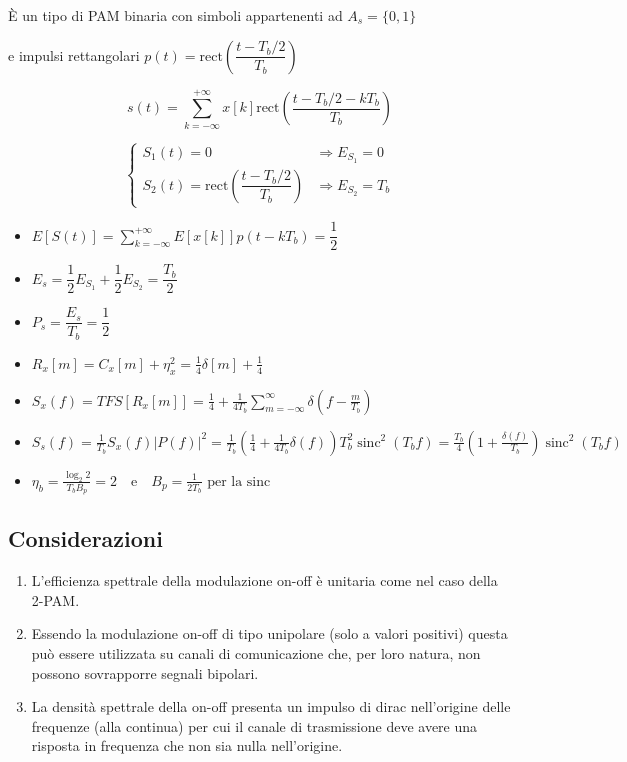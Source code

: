 È un tipo di PAM binaria con simboli appartenenti ad $A_s = \{0, 1\}$

e impulsi rettangolari  $p(t) = \text{rect}\left(\dfrac{t-T_b/2}{T_b}\right)$

\[
    s(t) = \sum_{k=-\infty}^{+\infty} x\left[k\right] \text{rect}\left(\dfrac{t-T_b/2-kT_b}{T_b}\right)
\]

\[
    \begin{cases}
        S_1(t) = 0                                            & \Rightarrow E_{S_1} = 0   \\
        S_2(t) = \text{rect}\left(\dfrac{t-T_b/2}{T_b}\right) & \Rightarrow E_{S_2} = T_b
    \end{cases}
\]


\begin{itemize}
    \item $
              E[S(t)] = \sum_{k=-\infty}^{+\infty} E[x[k]] p(t-kT_b) = \dfrac{1}{2}$
    \item $
              E_s = \dfrac{1}{2}E_{S_1} + \dfrac{1}{2}E_{S_2} = \dfrac{T_b}{2}
          $
    \item
          $
              P_s = \dfrac{E_s}{T_b} = \dfrac{1}{2}$
    \item $R_x[m] = C_x[m] + {\eta}_x^2 = \frac{1}{4} {\delta}[m] + \frac{1}{4}$

    \item $S_x(f) = TFS\left[ R_x[m] \right] = \frac{1}{4} + \frac{1}{4T_b} \sum_{m=-\infty}^{\infty} \delta\left(f - \frac{m}{T_b}\right)$
    \item $S_s(f) = \frac{1}{T_b} S_x(f)|P(f)|^2 = \frac{1}{T_b} \left( \frac{1}{4} + \frac{1}{4T_b} \delta(f) \right) T_b^2 \operatorname{sinc}^2(T_b f) = \frac{T_b}{4} \left( 1 + \frac{\delta(f)}{T_b} \right)\operatorname{sinc}^2(T_b f)$

    \item ${\eta}_b = \frac{\log_2{2}}{T_b B_p} = 2 \quad \text{e} \quad B_p = \frac{1}{2T_b} \text{ per la sinc}$
\end{itemize}



\subsection*{Considerazioni}
\begin{enumerate}
    \item L'efficienza spettrale della modulazione on-off è unitaria come nel caso della 2-PAM.
    \item Essendo la modulazione on-off di tipo unipolare (solo a valori positivi) questa può essere utilizzata su canali di comunicazione che, per loro natura, non possono sovrapporre segnali bipolari.
    \item La densità spettrale della on-off presenta un impulso di dirac nell'origine delle frequenze (alla continua) per cui il canale di trasmissione deve avere una risposta in frequenza che non sia nulla nell'origine.
\end{enumerate}
